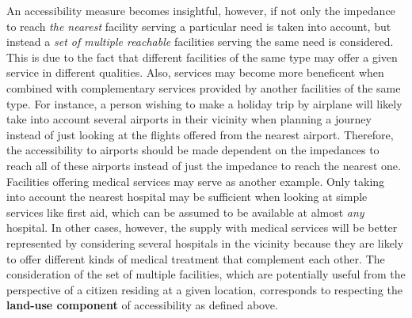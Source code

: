 An accessibility measure becomes insightful, however, if not only the impedance to reach \textit{the nearest} facility 
serving a particular need is taken into account, but instead a \textit{set of multiple reachable} facilities serving the same 
need is considered. This is due to the fact that different facilities of the same type may offer a given service in 
different qualities. Also, services may become more beneficent when combined with complementary services provided by 
another facilities of the same type. For instance, a person wishing to make a holiday trip by airplane will likely 
take into account several airports in their vicinity when planning a journey instead of just looking at the flights 
offered from the nearest airport. Therefore, the accessibility to airports should be made dependent on the impedances 
to reach all of these airports instead of just the impedance to reach the nearest one. Facilities offering medical 
services may serve as another example. Only taking into account the nearest hospital may be sufficient when looking 
at simple services like first aid, which can be assumed to be available at almost \textit{any} hospital. In other cases, 
however, the supply with medical services will be better represented by considering several hospitals in the vicinity 
because they are likely to offer different kinds of medical treatment that complement each other. 
The consideration of the set of multiple facilities, which are potentially useful from the perspective of a citizen residing
at a given location, corresponds to respecting the \textbf{land-use component} of accessibility as defined above.

